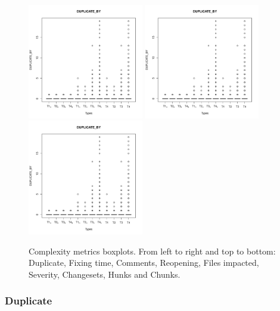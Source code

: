 \documentclass[natbib]{svjour3}
\begin{document}
\begin{figure}
\centering
\includegraphics[page=7, width=0.45\textwidth]{extract/Rplots}
\includegraphics[page=8, width=0.45\textwidth]{extract/Rplots} \\
\includegraphics[page=9, width=0.45\textwidth]{extract/Rplots}
\caption{Complexity metrics boxplots. From left to right and top to bottom: Duplicate, Fixing time, Comments, Reopening, Files impacted, Severity, Changesets, Hunks and Chunks.
\label{fig:boxplots}}

\end{figure}

 


\subsubsection{Duplicate}\label{duplicate}
\end{document}
